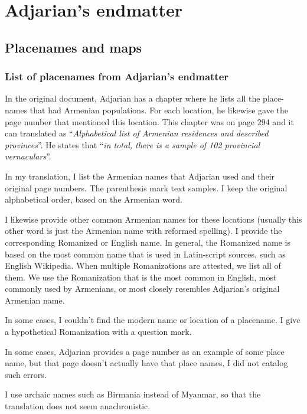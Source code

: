 \part{Adjarian's endmatter}
\chapter{Placenames and maps }


\section{List of placenames from Adjarian's endmatter}
In the original document, Adjarian has a chapter where he lists all the place-names that had Armenian populations. For each location, he likewise gave the page number that mentioned this location.  This chapter was on page   294 and it can translated as ``\textit{Alphabetical list of Armenian residences and described provinces}''. He states that ``\textit{in total, there is a sample of 102 provincial vernaculars}''. 

In my translation, I list the Armenian names that Adjarian used and their original page numbers. The parenthesis mark text samples. I keep the original alphabetical order, based on the Armenian word.

I likewise provide other common Armenian names for these locations (usually this other word is just the Armenian name with reformed spelling). I provide  the corresponding Romanized or English name. In general, the Romanized name is based on the most common name that is used in Latin-script sources, such as English Wikipedia. When multiple Romanizations are attested, we list all of them. We use the Romanization that is the most common in English, most commonly used by Armenians, or most closely resembles Adjarian's original Armenian name.

In some cases, I couldn't find the modern name or location of a placename. I give a hypothetical Romanization  with a question mark. 

In some cases, Adjarian provides a page number as an example of some place name, but that page doesn't actually have that place names. I did not  catalog such errors. 

I use archaic names such as Birmania instead of Myanmar, so that the translation does not seem anachronistic. 


